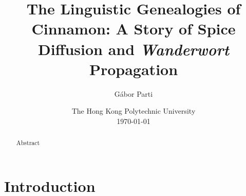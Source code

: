 \documentclass[12pt]{article}
\title{The Linguistic Genealogies of Cinnamon: A Story of Spice Diffusion and \textit{Wanderwort} Propagation}
\author{Gábor Parti {\small\orcid{0000-0003-2042-4655}}}
\date{The Hong Kong Polytechnic University\\[2.5ex]\today}
\begin{document}

\maketitle

\begin{abstract}
    Abstract
\end{abstract}


\section{Introduction}











\end{document}
